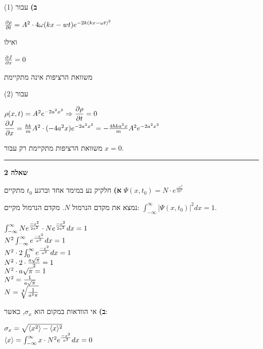 \documentclass[14pt]{extarticle}
\makeatletter
\newenvironment{lefteqs}{%
    \begin{english}%
    \begin{flushleft}%
    \renewcommand{\arraystretch}{1.3}%
    $\begin{array}{@{}l@{}}%
}{%
    \end{array}$%
    \end{flushleft}%
    \end{english}%
}
\makeatother
\begin{document}
\textbf{ב)}
עבור (1)

\begin{lefteqs}
    \frac{\partial \rho}{\partial t} = A^2 \cdot 4\omega(kx-wt)e^{-2k(kx-\omega t)^2}
\end{lefteqs}

ואילו
\begin{lefteqs}
    \frac{\partial J}{\partial x} = 0
\end{lefteqs}
משוואת הרציפות אינה מתקיימת

עבור (2)
\begin{lefteqs}
    \rho(x,t)=A^2e^{-2a^2x^2} \Rightarrow \dfrac{\partial \rho}{\partial t} = 0 \\
    \dfrac{\partial J}{\partial x} = \frac{\hbar k}{m} A^2 \cdot (-4a^2x)e^{-2a^2x^2} = -\frac{4\hbar k a^2 x}{m} A^2 e^{-2a^2x^2}
\end{lefteqs}

משוואת הרציפות מתקיימת רק עבור $x=0$.


\vspace{3em}
\hrule
\vspace{2em}

\textbf{\large שאלה 2}

\textbf{א)}
חלקיק נע במימד אחד וברגע $t_0$ מתקיים $\Psi(x,t_0)=N\cdot e^{\frac{-x^2}{2a^2}}$

נמצא את מקדם הנרמול $N$. מקדם הנרמול מקיים: $\int_{-\infty}^{\infty} |\Psi(x,t_0)|^2 dx = 1$.

\begin{lefteqs}
    \int_{-\infty}^{\infty}N e^{\frac{-x^2}{2a^2}} \cdot N e^{\frac{-x^2}{2a^2}} dx = 1 \\
    N^2 \int_{-\infty}^{\infty} e^{\frac{-x^2}{a^2}} dx = 1 \\
    N^2 \cdot 2 \int_{0}^{\infty} e^{\frac{-x^2}{a^2}} dx = 1 \\
    N^2 \cdot 2 \cdot \frac{a \sqrt{\pi}}{2} = 1 \\
    N^2 \cdot a \sqrt{\pi} = 1 \\
    N^2 = \frac{1}{a \sqrt{\pi}} \\
    N = \sqrt[4]{\frac{1}{a^2 \pi}}
\end{lefteqs}

\textbf{ב)}
אי הוודאות במקום הוא $\sigma_x$, כאשר:

\begin{lefteqs}
    \sigma_x = \sqrt{\langle x^2 \rangle - \langle x \rangle^2} \\
    \langle x \rangle = \int_{-\infty}^{\infty} x \cdot N^2 e^{\frac{-x^2}{a^2}} dx = 0 \\
\end{lefteqs}
\end{document}
